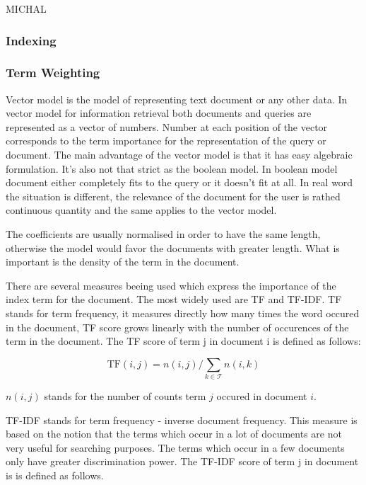 MICHAL 

\subsubsection{Indexing}
\label{sec:indexing_term_weighting}

\subsubsection{Term Weighting}
\label{sec:term_weighting}

Vector model is the model of representing text document or any other data. In vector model for information retrieval both documents and queries are represented as a vector of numbers. Number at each position of the vector corresponds to the term importance for the representation of the query or document. The main advantage of the vector model is that it has easy algebraic formulation. It's also not that strict as the boolean model. In boolean model document either completely fits to the query or it doesn't fit at all. In real word the situation is different, the relevance of the document for the user is rathed continuous quantity and the same applies to the vector model.

The coefficients are usually normalised in order to have the same length, otherwise the model would favor the documents with greater length. What is important is the density of the term in the document.

There are several measures beeing used which express the importance of the index term for the document. The most widely used are TF and TF-IDF. 
TF stands for term frequency, it measures directly how many times the word occured in the document, TF score grows linearly with the number of occurences of the term in the document. The TF score of term j in document i is defined as follows:

\[\text{TF}(i,j) = n(i,j) / \sum_{k \in \mathcal{T}}{n(i,k)}\]

$n(i,j)$ stands for the number of counts term $j$ occured in document $i$.

TF-IDF stands for term frequency - inverse document frequency. This measure is based on the notion that the terms which occur in a lot of documents are not very useful for searching purposes. The terms which occur in a few documents only have greater discrimination power. The TF-IDF score of term j in document is is defined as follows.

